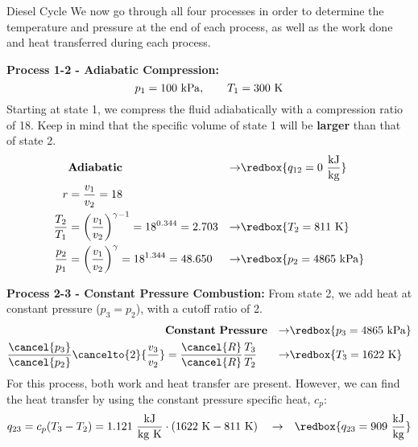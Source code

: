 \begin{example}[label=ex:ch3_diesel]{Diesel Cycle}
We now go through all four processes in order to determine the temperature and pressure at the end of each process, as well as the work done and heat transferred during each process.

{\bf Process 1-2 - Adiabatic Compression:}
\begin{equation*}
  p_1 = 100\ {\rm kPa}, \quad \quad T_1 = 300\ {\rm K}
\end{equation*}
Starting at state 1, we compress the fluid adiabatically with a compression ratio of 18.  Keep in mind that the specific volume of state 1 will be {\bf larger} than that of state 2.
\begin{align*}
  &{\rm \bf Adiabatic} &\rightarrow& \redbox{q_{12} = 0\ \frac{\rm kJ}{\rm kg}} \\
  r &= \frac{v_1}{v_2} = 18 \\
  \frac{T_2}{T_1} &= \left(\frac{v_1}{v_2}\right)^{\gamma -1} = 18^{0.344} = 2.703 &\rightarrow & \redbox{T_2 = 811\ {\rm K}} \\
  \frac{p_2}{p_1} &= \left(\frac{v_1}{v_2}\right)^{\gamma} = 18^{1.344} = 48.650 &\rightarrow& \redbox{ p_2 = 4865\ {\rm kPa}}%
\end{align*}

{\bf Process 2-3 - Constant Pressure Combustion:}
From state 2, we add heat at constant pressure ($p_3 = p_2$), with a cutoff ratio of 2.
\begin{align*}
  &{\rm \bf Constant\ Pressure}  &\rightarrow& \redbox{p_3 = 4865\ {\rm kPa}} \\
  \frac{\cancel{p_3}}{\cancel{p_2} } \cancelto{2}{\frac{v_3}{v_2}}&= \frac{\cancel{R}}{\cancel{R}}\frac{T_3}{T_2} &\rightarrow &\redbox{T_3 = 1622\ {\rm K}}
\end{align*}
For this process, both work and heat transfer are present.  However, we can find the heat transfer by using the constant pressure specific heat, $c_p$:
\begin{align*}
    q_{23} = c_p (T_3 - T_2) =1.121\ \frac{\rm kJ}{\rm kg\ K} \cdot \left(1622\ {\rm K} - 811\ {\rm K}\right)\quad&\rightarrow& \redbox{q_{23} = 909\ \frac{\rm kJ}{\rm kg}}
\end{align*}


\end{example}
